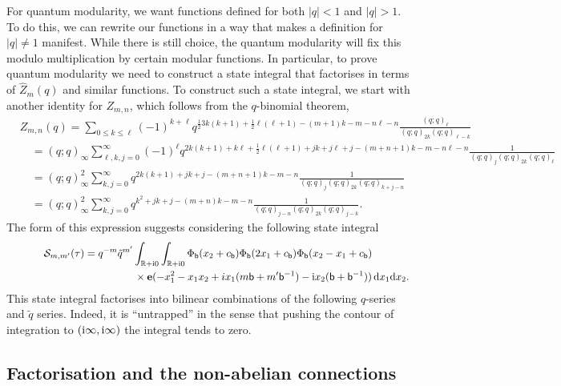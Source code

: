 \documentclass[pdftex]{sigma}
\numberwithin{equation}{section}
\def\BR{\mathbb{R}}
\def\tq{\tilde{q}}
\def\e{\mathbf e}
\def\BR{\mathbb R}
\def\calS{\mathcal S}
\def\tq{\tilde{q}}
\begin{document}
For quantum modularity, we want functions defined for both $|q|<1$ and $|q|>1$. To do this, we can rewrite our functions in a way that makes a definition for $|q|\neq1$ manifest. While there is still choice, the quantum modularity will fix this modulo multiplication by certain modular functions. In particular, to prove quantum modularity we need to construct a state integral that factorises in terms of $\widehat{Z}_{m}(q)$ and similar functions. To construct such a state integral, we start with another identity for $Z_{m,n}$, which follows from the $q$-binomial theorem,
\begin{align*}%
 &Z_{m,n}(q)
 =
 \sum_{0\leq k\leq\ell}(-1)^{k+\ell}q^{\frac{1}{2}3k(k+1)+\frac{1}{2}\ell(\ell+1)-(m+1)k-m-n\ell-n}\frac{(q;q)_{\ell}}{(q;q)_{2k}(q;q)_{\ell-k}}\\
 &\quad{}=
 (q;q)_{\infty}\sum_{\ell,k,j=0}^{\infty}(-1)^{\ell}q^{2k(k+1)+k\ell+\frac{1}{2}\ell(\ell+1)+jk+j\ell+j-(m+n+1)k-m-n\ell-n}\frac{1}{(q;q)_{j}(q;q)_{2k}(q;q)_{\ell}}\\
 &\quad{}=
 (q;q)_{\infty}^2\sum_{k,j=0}^{\infty}q^{2k(k+1)+jk+j-(m+n+1)k-m-n}\frac{1}{(q;q)_{j}(q;q)_{2k}(q;q)_{k+j-n}}\\
 &\quad{}=
 (q;q)_{\infty}^2\sum_{k,j=0}^{\infty}q^{k^2+jk+j-(m+n)k-m-n}\frac{1}{(q;q)_{j-n}(q;q)_{2k}(q;q)_{j-k}} .
\end{align*}
The form of this expression suggests considering the following state integral
\begin{gather}\label{eq:state.int}
 \calS_{m,m'}(\tau) =q^{-m}\tq^{m'}\int_{\BR+{\rm i}0}\int_{\BR+{\rm i}0} \Phi_{\mathsf{b}}(x_2+c_{\mathsf{b}})\Phi_{\mathsf{b}}(2x_1+c_{\mathsf{b}})\Phi_{\mathsf{b}}(x_2-x_1+c_{\mathsf{b}})\\
 \hphantom{\calS_{m,m'}(\tau) =q^{-m}\tq^{m'}\int_{\BR+{\rm i}0}\int}{}
 \times\e(-x_1^2-x_1x_2+ix_1(m\mathsf{b}+m'\mathsf{b}^{-1})-{\rm i}x_2(\mathsf{b}+\mathsf{b}^{-1}))\,{\rm d}x_1{\rm d}x_2 .\nonumber
\end{gather}
This state integral factorises into bilinear combinations of the following $q$-series and $\tq$ series. Indeed, it is ``untrapped'' in the sense that pushing the contour of integration to $({\rm i}\infty,{\rm i}\infty)$ the integral tends to zero.

\subsection{Factorisation and the non-abelian connections}
\end{document}
